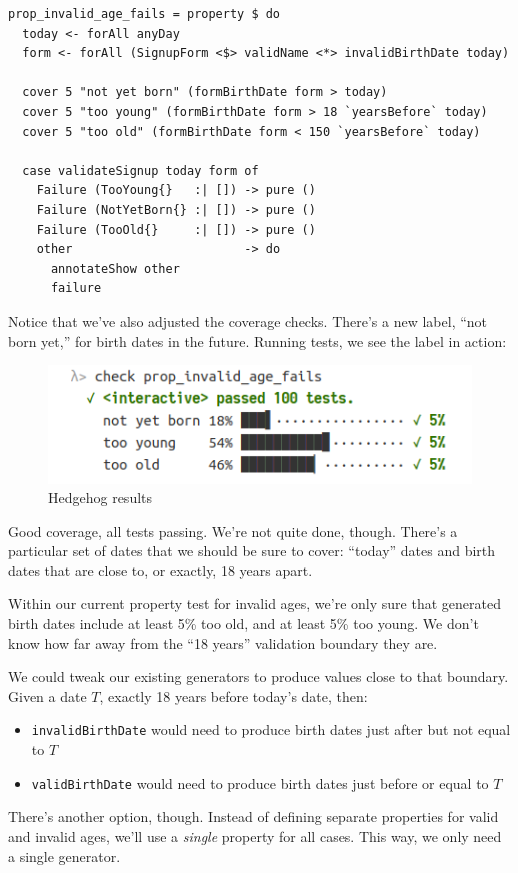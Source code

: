 \begin{verbatim}
prop_invalid_age_fails = property $ do
  today <- forAll anyDay
  form <- forAll (SignupForm <$> validName <*> invalidBirthDate today)

  cover 5 "not yet born" (formBirthDate form > today)
  cover 5 "too young" (formBirthDate form > 18 `yearsBefore` today)
  cover 5 "too old" (formBirthDate form < 150 `yearsBefore` today)

  case validateSignup today form of
    Failure (TooYoung{}   :| []) -> pure ()
    Failure (NotYetBorn{} :| []) -> pure ()
    Failure (TooOld{}     :| []) -> pure ()
    other                        -> do
      annotateShow other
      failure
\end{verbatim}
Notice that we've also adjusted the coverage checks. There's a new
label, ``not born yet,'' for birth dates in the future. Running tests,
we see the label in action:

\begin{figure}[htbp]
 \centering
 \includegraphics[width=.95\linewidth]{./pics/hedgehog4.png}
 \caption{Hedgehog results}
 \label{fig:hedgehog4}
\end{figure}

\noindent Good coverage, all tests passing. We're not quite done, though. There's
a particular set of dates that we should be sure to cover: ``today''
dates and birth dates that are close to, or exactly, 18 years apart.

Within our current property test for invalid ages, we're only sure that
generated birth dates include at least 5\% too old, and at least 5\% too
young. We don't know how far away from the ``18 years'' validation
boundary they are.

We could tweak our existing generators to produce values close to that
boundary. Given a date $T$, exactly 18 years before today's date, then:

\begin{itemize}

\item
  \texttt{invalidBirthDate} would need to produce birth dates just after
  but not equal to $T$  
\item
  \texttt{validBirthDate} would need to produce birth dates just before
  or equal to $T$
\end{itemize}
There's another option, though. Instead of defining separate properties
for valid and invalid ages, we'll use a \emph{single} property for all
cases. This way, we only need a single generator.

